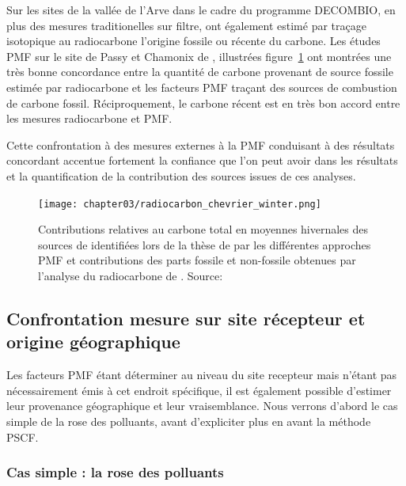 Sur les sites de la vallée de l'Arve dans le cadre du programme DECOMBIO, en plus des mesures
traditionelles sur filtre, \textcite{bonvalotEstimating2016} ont également estimé par
traçage isotopique au radiocarbone  l'origine fossile ou récente du carbone.
Les études PMF sur le site de Passy et Chamonix de \textcite{chevrierChauffage2016},
illustrées figure~\ref{fig:chapter03/radiocarbon_chevrier_winter} ont
montrées une très bonne concordance entre la quantité de carbone provenant de source
fossile estimée par radiocarbone et les facteurs PMF traçant des sources de combustion de
carbone fossil. Réciproquement, le carbone récent est en très bon accord entre les mesures
radiocarbone et PMF.

Cette confrontation à des mesures externes à la PMF conduisant à des résultats concordant
accentue fortement la confiance que l'on peut avoir dans les résultats et la
quantification de la contribution des sources issues de ces analyses.

\begin{figure}[ht]
    \centering
    \texttt{[image: chapter03/radiocarbon\_chevrier\_winter.png]}
    \caption{Contributions relatives au carbone total en moyennes hivernales des sources
        de \PMdix identifiées lors de la thèse de \textcite{chevrierChauffage2016} par les
        différentes approches PMF et contributions des parts fossile et non-fossile
        obtenues par l’analyse du radiocarbone de \textcite{bonvalotEstimating2016}.
    Source: \textcite[figure 75]{chevrierChauffage2016}}%
    \label{fig:chapter03/radiocarbon_chevrier_winter}
\end{figure}

\subsection{Confrontation mesure sur site récepteur et origine géographique}%
\label{sub:confrontation_mesure_sur_site_recepteur_et_origine_geographique}

Les facteurs PMF étant déterminer au niveau du site recepteur mais n'étant pas
nécessairement émis à cet endroit spécifique, il est également possible d'estimer leur
provenance géographique et leur vraisemblance. Nous verrons d'abord le cas simple de la
rose des polluants, avant d'expliciter plus en avant la méthode PSCF.


\subsubsection{Cas simple : la rose des polluants}%
\label{ssub:cas_simple_la_rose_des_polluants}

